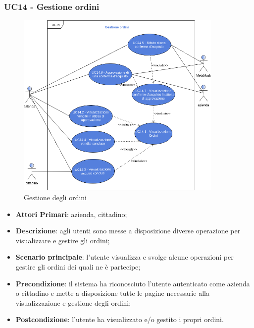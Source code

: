 \subsubsection{UC14 - Gestione ordini}
\begin{figure}[h]
	\includegraphics[width=10cm]{res/images/UC14-GestioneOrdini.png}
	\centering
	\caption{Gestione degli ordini}
\end{figure}
\begin{itemize}
	\item \textbf{Attori Primari}: azienda, cittadino;
	\item \textbf{Descrizione}: agli utenti sono messe a disposizione diverse operazione per visualizzare e gestire gli ordini;
	\item \textbf{Scenario principale}: l'utente visualizza e svolge alcune operazioni per gestire gli ordini dei quali ne è partecipe;
	\item \textbf{Precondizione}: il sistema ha riconosciuto l'utente autenticato come azienda o cittadino e mette a disposizione tutte le pagine necessarie alla visualizzazione e gestione degli ordini;
	\item \textbf{Postcondizione}: l'utente ha visualizzato e/o gestito i propri ordini.
\end{itemize} 
